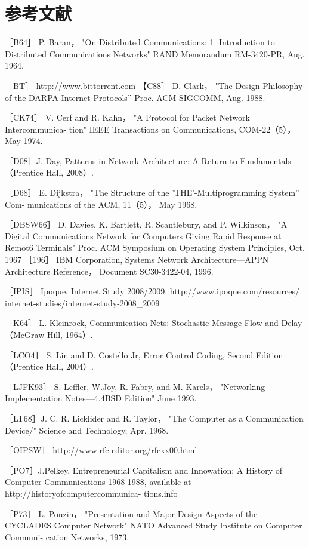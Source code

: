 \section{参考文献}
\iffalse
［B64］ P. Baran， "On Distributed Communications: 1. Introduction to Distributed
Communications Networks" RAND Memorandum RM-3420-PR, Aug. 1964.

［BT］ http://www.bittorrent.com
【C88］ D. Clark，
"The Design Philosophy of the DARPA Internet Protocols” Proc.
ACM SIGCOMM, Aug. 1988.

［CK74］ V. Cerf and R. Kahn， "A Protocol for Packet Network Intercommunica-
tion" IEEE Transactions on Communications, COM-22（5）， May 1974.

［D08］J. Day, Patterns in Network Architecture: A Return to Fundamentals （Prentice
Hall, 2008）.

［D68］ E. Dijkstra， "The Structure of the 'THE'-Multiprogramming System” Com-
munications of the ACM, 11（5）， May 1968.

［DBSW66］ D. Davies, K. Bartlett, R. Scantlebury, and P. Wilkinson， "A Digital
Communications Network for Computers Giving Rapid Response at Remot6
Terminals" Proc. ACM Symposium on Operating System Principles, Oct. 1967
［196］ IBM Corporation, Systems Network Architecture—APPN Architecture Reference，
Document SC30-3422-04, 1996.

［IPIS］ Ipoque, Internet Study 2008/2009, http://www.ipoque.com/resources/
internet-studies/internet-study-2008_2009

［K64］ L. Kleinrock, Communication Nets: Stochastic Message Flow and Delay
（McGraw-Hill, 1964）.

［LCO4］ S. Lin and D. Costello Jr, Error Control Coding, Second Edition （Prentice
Hall, 2004）.

［LJFK93］ S. Leffler, W.Joy, R. Fabry, and M. Karels， "Networking Implementation
Notes—4.4BSD Edition" June 1993.

［LT68］J. C. R. Licklider and R. Taylor， "The Computer as a Communication
Device/" Science and Technology, Apr. 1968.

［OIPSW］ http://www.rfc-editor.org/rfcxx00.html

［PO7］J.Pelkey, Entrepreneurial Capitalism and Innowation: A History of Computer
Communications 1968-1988, available at http://historyofcomputercommunica-
tions.info

［P73］ L. Pouzin， "Presentation and Major Design Aspects of the CYCLADES
Computer Network" NATO Advanced Study Institute on Computer Communi-
cation Networks, 1973.

